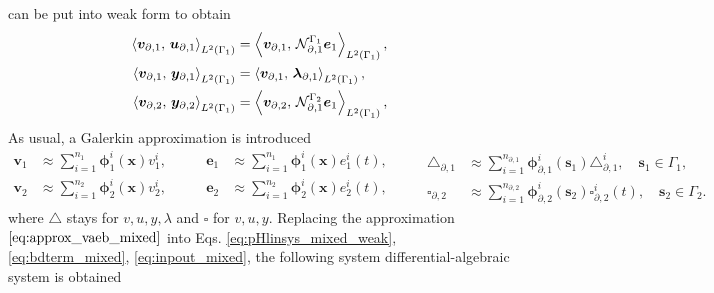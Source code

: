 can be put into weak form to obtain
\begin{equation}\label{eq:inpout_mixed}
\begin{aligned}
\inner[L^2(\Gamma_1)]{\bm{v}_{\partial, 1}}{\bm{u}_{\partial, 1}} &= \inner[L^2(\Gamma_1)]{\bm{v}_{\partial, 1}}{\mathcal{N}_{\partial, 1}^{\Gamma_1}\bm{e}_{1}}, \\
\inner[L^2(\Gamma_1)]{\bm{v}_{\partial, 1}}{\bm{y}_{\partial, 1}} &= \inner[L^2(\Gamma_1)]{\bm{v}_{\partial, 1}}{\bm{\lambda}_{\partial, 1}}, \\
\inner[L^2(\Gamma_1)]{\bm{v}_{\partial, 2}}{\bm{y}_{\partial, 2}} &= \inner[L^2(\Gamma_1)]{\bm{v}_{\partial, 2}}{\mathcal{N}_{\partial, 1}^{\Gamma_2}\bm{e}_{1}}, \\
\end{aligned}
\end{equation}
As usual, a Galerkin approximation is introduced    
\begin{equation}\label{eq:approx_vaeb_mixed}
\begin{aligned}
\bm{v}_1 &\approx \sum_{i=1}^{n_1} \bm{\phi}_1^i(\bm{x}) v_1^i, \\
\bm{v}_2 &\approx \sum_{i=1}^{n_2} \bm{\phi}_2^i(\bm{x}) v_2^i, \\
\end{aligned}  \qquad 
\begin{aligned}
\bm{e}_1 &\approx \sum_{i=1}^{n_1} \bm{\phi}_1^i(\bm{x}) e_1^i(t), \\
\bm{e}_2 &\approx \sum_{i=1}^{n_2} \bm{\phi}_2^i(\bm{x}) e_2^i(t),  \\
\end{aligned} \qquad 
\begin{aligned}
\bm{\triangle}_{\partial, 1} &\approx \sum_{i=1}^{n_{\partial, 1}} \bm{\phi}_{\partial, 1}^i(\bm{s}_1) \triangle_{\partial, 1}^i, \quad \bm{s}_1 \in \Gamma_1, \\
\bm{\square}_{\partial, 2} &\approx \sum_{i=1}^{n_{\partial, 2}} \bm{\phi}_{\partial, 2}^i(\bm{s}_2) \square_{\partial, 2}^i(t), \quad \bm{s}_2 \in \Gamma_2.
\end{aligned}
\end{equation}
where $\triangle$ stays for $v, u, y, {\lambda}$ and $\square$ for $v, u, y$. Replacing the approximation $\ref{eq:approx_vaeb_mixed}$ into Eqs. \ref{eq:pHlinsys_mixed_weak}, \ref{eq:bdterm_mixed}, \ref{eq:inpout_mixed}, the following system differential-algebraic system is obtained
